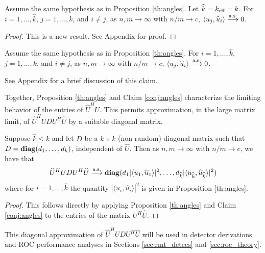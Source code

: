 \begin{Th}\label{th:other angles}
Assume the same hypothesis as in Proposition \ref{th:angles}. Let $\widehat{k}=k_\text{eff}=k$. For $i=1,\dots,\widehat{k}$, $j=1,\dots,k$, and $i\neq j$, as $n,m\to\infty$ with $n/m\to c$, $\langle u_j,\widehat{u}_i\rangle \overset{\textrm{a.s.}}{\longrightarrow} 0.$
\end{Th}
\begin{proof}
This is a new result. See Appendix for proof.
\end{proof}\vskip0.25cm

\begin{Conj}\label{conj:angles}
Assume the same hypothesis as in Proposition \ref{th:angles}. For $i=1,\dots,\widehat{k}$, $j=1,\dots,k$, and $i\neq j$, as $n,m\to\infty$ with $n/m\to c$, $\langle u_j,\widehat{u}_i\rangle \overset{\textrm{a.s.}}{\longrightarrow} 0$.
\end{Conj}
\begin{Remark}
See Appendix for a brief discussion of this claim.
\end{Remark}

Together, Proposition \ref{th:angles} and Claim \ref{conj:angles} characterize the limiting behavior of the entries of $\widehat{U}^HU$. This permits approximation, in the large matrix limit, of  $\widehat{U}^HU D U^H\widehat{U}$ by a suitable diagonal matrix.

\begin{Corr}\label{corr:matrix}
Suppose $\widehat{k}\leq k$ and let $D$ be a $k \times k$ (non-random) diagonal matrix such that $D=\mathop{\bf diag}(d_1,\ldots,d_{k})$, independent of $\widehat{U}$. Then as $n,m \longrightarrow \infty$ with $n/m \to c$, we have that
\begin{equation*}
\widehat{U}^HU D U^H\widehat{U}\overset{\textrm{a.s.}}{\longrightarrow} \mathop{\bf diag}(d_1 |\langle u_1,\widehat{u}_1\rangle|^2,\dots, d_{\widehat{k}} |\langle u_{\widehat{k}},\widehat{u}_{\widehat{k}}\rangle|^2)
\end{equation*}
where for $i=1,\dots,\widehat{k}$ the quantity $|\langle u_i,\widehat{u}_i\rangle|^2$ is given in Proposition \ref{th:angles}.
\end{Corr}
\begin{proof}
This follows directly by applying Proposition \ref{th:angles} and Claim \ref{conj:angles} to the entries of the matrix $U^H\widehat{U}$.
\end{proof}

This diagonal approximation of $\widehat{U}^HU D U^H\widehat{U}$ will be used in detector derivations and ROC performance analyses in Sections \ref{sec:rmt_detecs} and \ref{sec:roc_theory}.

